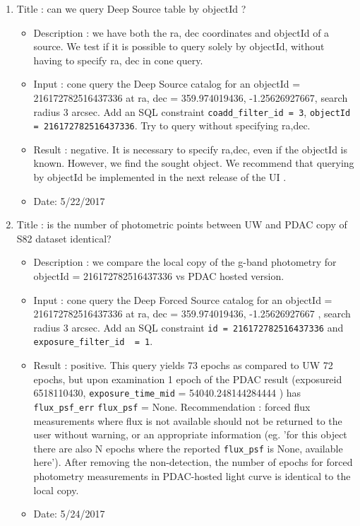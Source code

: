 \documentclass[DM,lsstdraft,toc,usenatbib]{lsstdoc}
\begin{document}
\begin{enumerate}
   \item Title : can we query Deep Source table by objectId ?
    \begin{itemize}
      \item Description : we have both the ra, dec coordinates and objectId of a source.  We test if it is possible to query solely by objectId, without having to specify ra, dec in cone query. 
      \item Input : cone query the Deep Source catalog for an objectId = 216172782516437336 at ra, dec  = 359.974019436\degree,  -1.25626927667\degree , search radius 3 arcsec.  Add an   SQL constraint \verb|coadd_filter_id = 3|, \verb|objectId = 216172782516437336|. Try to query without specifying ra,dec. 
      \item Result : negative.  It is necessary to specify ra,dec, even if the objectId is known.  However, we find the sought object. We recommend that querying by objectId  be implemented in the next release of the UI . 
      \item Date: 5/22/2017
    \end{itemize}


      \item Title : is the number of photometric points between UW and PDAC copy of S82 dataset identical? 
    \begin{itemize}
      \item Description : we compare the local copy of the g-band photometry for objectId = 216172782516437336 vs PDAC hosted version. 
      \item Input : cone query the Deep Forced Source catalog for an objectId = 216172782516437336 at ra, dec  = 359.974019436,  -1.25626927667 , search radius 3 arcsec. Add an   SQL constraint \verb|id = 216172782516437336| and \verb|exposure_filter_id  = 1|.
      \item Result : positive. This query yields 73 epochs as compared to UW 72 epochs, but upon examination 1 epoch of the PDAC result (exposureid 6518110430, \verb|exposure_time_mid| = 54040.248144284444 )  has \verb|flux_psf_err|  \verb|flux_psf|  = None. Recommendation : forced flux measurements where flux is not available should not be returned to the user without warning, or an appropriate information (eg.  'for this object there are also N epochs where the reported \verb|flux_psf| is None, available here'). After removing the non-detection, the number of epochs for forced photometry measurements in PDAC-hosted light curve is identical to the local copy. 
      \item Date: 5/24/2017
    \end{itemize}


\end{enumerate}
\end{document}
